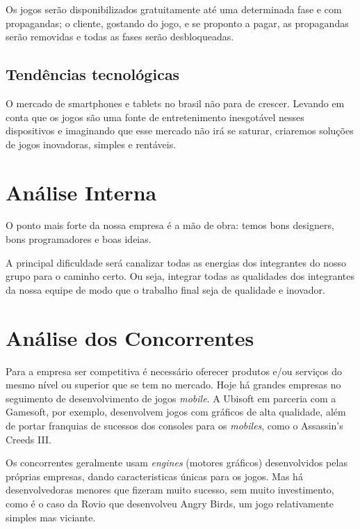 \documentclass{abnt}
\begin{document}
		Os jogos serão disponibilizados gratuitamente até uma determinada fase e
		com propagandas; o cliente, gostando do jogo, e se proponto a pagar, as 
		propagandas serão removidas e todas as fases serão desbloqueadas.

		\section {Tendências tecnológicas}
		O mercado de smartphones e tablets no brasil não para de crescer. 
		Levando em conta que os jogos são uma fonte de entretenimento inesgotável
		nesses dispositivos e imaginando que esse mercado não irá se saturar, 
		criaremos soluções de jogos inovadoras, simples e rentáveis.


	\chapter {Análise Interna}
		O ponto mais forte da nossa empresa é a mão de obra: temos bons designers,  
		bons programadores e boas ideias.

		A principal dificuldade será canalizar todas as energias dos integrantes 
		do nosso grupo para o caminho certo. Ou seja, integrar todas as qualidades
		dos integrantes da nossa equipe de modo que o trabalho final seja de
		qualidade e inovador.

	\chapter {Análise dos Concorrentes}
	
		Para a empresa ser competitiva é necessário oferecer produtos e/ou serviços do mesmo nível ou superior que se tem no mercado.
		Hoje há grandes empresas no seguimento de desenvolvimento de jogos \textit{mobile}. A Ubisoft\textsuperscript{\texttrademark} em parceria com a Gamesoft\textsuperscript{\texttrademark}, por exemplo, desenvolvem jogos com gráficos de alta qualidade, além de portar franquias de sucessos dos consoles para os \textit{mobiles}, como o Assassin's Creeds III\textsuperscript{\textregistered}.
	
		Os concorrentes geralmente usam \textit{engines} (motores gráficos) desenvolvidos pelas próprias empresas, dando caracteristicas únicas para os jogos.
		Mas há desenvolvedoras menores que fizeram muito sucesso, sem muito investimento, como é o caso da Rovio que desenvolveu Angry Birds\textsuperscript{\textregistered}, um jogo relativamente simples mas viciante. 
		
\end{document}

